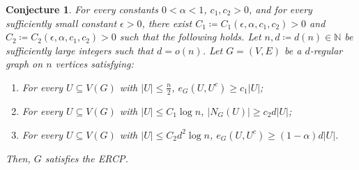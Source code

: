 \documentclass[notitlepage]{scrartcl}
\newtheorem{conjecture}[thm]{Conjecture}
\begin{document}
\begin{conjecture}
    For every constants $0<\alpha<1$, $c_1,c_2>0$, and for every sufficiently small constant $\epsilon>0$, there exist $C_1\coloneqq C_1(\epsilon, \alpha, c_1,c_2)>0$ and $C_2\coloneqq C_2(\epsilon, \alpha, c_1,c_2)>0$ such that the following holds. Let $n,d\coloneqq d(n)\in \mathbb{N}$ be sufficiently large integers such that $d=o(n)$. Let $G=(V,E)$ be a $d$-regular graph on $n$ vertices satisfying:
    \begin{enumerate}[\arabic*{}.]
        \item For every $U\subseteq V(G)$ with $|U|\leq \frac{n}{2}$, $e_G(U,U^c)\geq c_1|U|$;
        \item For every $U\subseteq V(G)$ with $|U|\leq C_1\log n$, $|N_G(U)|\ge c_2d|U|$;
        \item For every $U\subseteq V(G)$ with $|U|\leq C_2d^2\log n$, $e_G(U,U^c)\ge \left(1-\alpha\right)d|U|$.
    \end{enumerate}
    Then, $G$ satisfies the ERCP.
\end{conjecture}



\end{document}
